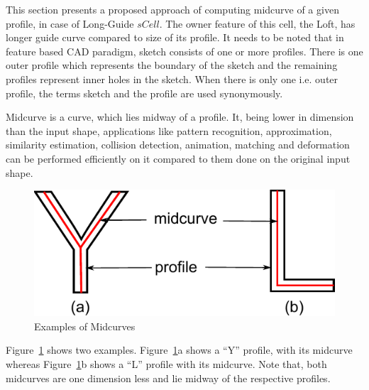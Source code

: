 This section presents a proposed approach of computing midcurve of a given profile, in case of Long-Guide $sCell$. The owner feature of this cell, the Loft, has longer guide curve compared to size of its profile. It needs to be noted that in feature based CAD paradigm, sketch consists of one or more profiles. There is one outer profile which represents the boundary of the sketch and the remaining profiles represent inner holes in the sketch. When there is only one i.e. outer profile, the terms sketch and the profile are used synonymously.

Midcurve is a curve, which lies midway of a profile.  It, being lower in dimension than the input shape, applications like pattern recognition, approximation, similarity estimation, collision detection, animation, matching and deformation can be performed efficiently on it compared to them done on the original input shape. 



\begin{figure}[h]
\centering \includegraphics[width=0.45\linewidth]{images/midcurveexamples_1.pdf} 
\caption{Examples of Midcurves}
\label{fig_midcruveexamples}
\end{figure}


Figure~\ref{fig_midcruveexamples} shows two examples. Figure~\ref{fig_midcruveexamples}a shows a ``Y'' profile, with its midcurve whereas Figure~\ref{fig_midcruveexamples}b shows a ``L'' profile with its midcurve. Note that, both midcurves are one dimension less and lie midway of the respective profiles.

